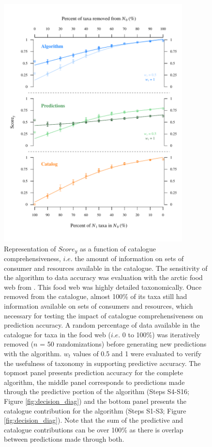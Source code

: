 \newpage
    \begin{figure}[h]
      \centering\includegraphics[height=35em]{./chapitre3/figures/catalog_predictions3.pdf}
      \caption{Representation of $Score_y$ as a function of catalogue comprehensiveness, $i.e.$ the amount of information on sets of consumer and resources available in the catalogue. The sensitivity of the algorithm to data accuracy was evaluation with the arctic food web from \citet{kortsch2015}. This food web was highly detailed taxonomically. Once removed from the catalogue, almost 100\% of its taxa still had information available on sets of consumers and resources, which necessary for testing the impact of catalogue comprehensiveness on prediction accuracy. A random percentage of data available in the catalogue for taxa in the food web ($i.e.$ 0 to 100\%) was iteratively removed ($n$ = 50 randomizations) before generating new predictions with the algorithm. $w_t$ values of 0.5 and 1 were evaluated to verify the usefulness of taxonomy in supporting predictive accuracy. The topmost panel presents prediction accuracy for the complete algorithm, the middle panel corresponds to predictions made through the predictive portion of the algorithm (Steps S4-S16; Figure \ref{fig:decision_diag}) and the bottom panel presents the catalogue contribution for the algorithm (Steps S1-S3; Figure \ref{fig:decision_diag}). Note that the sum of the predictive and catalogue contributions can be over 100\% as there is overlap between predictions made through both.}
      \label{fig:catalog_pred}
    \end{figure}

